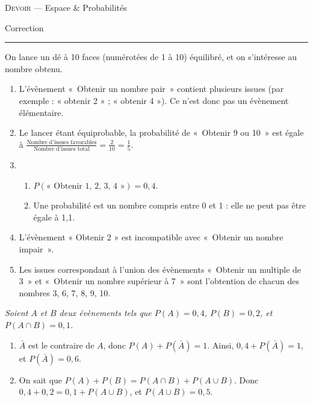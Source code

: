 \documentclass[11pt]{article}
\begin{document}
\begin{center}
  \textsc{Devoir} --- Espace \& Probabilités

  Correction
\end{center}
\hrule

\begin{exercice}[Définitions]
  \begin{em}
  On lance un dé à 10 faces (numérotées de 1 à 10) équilibré, et on s'intéresse au nombre obtenu.
\end{em}
  \begin{enumerate}
    \item L'évènement «~Obtenir un nombre pair~» contient plusieurs issues (par exemple : « obtenir 2 » ; « obtenir 4 »). Ce n'est donc pas un évènement élémentaire.
    \item Le lancer étant équiprobable, la probabilité de «~Obtenir 9 ou 10~» est égale à $\frac{\text{Nombre d'issues favorables}}{\text{Nombre d'issues total}}=\frac{2}{10}=\frac{1}{5}$.
    \item
      \begin{enumerate}
        \item $P(\text{« Obtenir 1, 2, 3, 4 »}) = 0,4$.
      \item Une probabilité est un nombre compris entre 0 et 1 : elle ne peut pas être égale à 1,1.
    \end{enumerate}
    \item L'évènement « Obtenir 2 » est incompatible avec «~Obtenir un nombre impair~».
    \item Les issues correspondant à l'union des évènements «~Obtenir un multiple de 3~» et «~Obtenir un nombre supérieur à 7~» sont l'obtention de chacun des nombres 3, 6, 7, 8, 9, 10.
  \end{enumerate}
\end{exercice}

\begin{exercice}
  \emph{Soient $A$ et $B$ deux évènements tels que $P(A)=0,4$, $P(B)=0,2$, et $P(A\cap B)=0,1$.}
  \begin{enumerate}
    \item $\bar A$ est le contraire de $A$, donc $P(A)+P(\bar A)=1$. Ainsi, $0,4+P(\bar A)=1$, et $P(\bar A)=0,6$.
    \item On sait que $P(A)+P(B)=P(A\cap B)+P(A\cup B)$. Donc $0,4+0,2=0,1+P(A\cup B)$, et $P(A\cup B)=0,5$.
  \end{enumerate}
\end{exercice}
\end{document}
